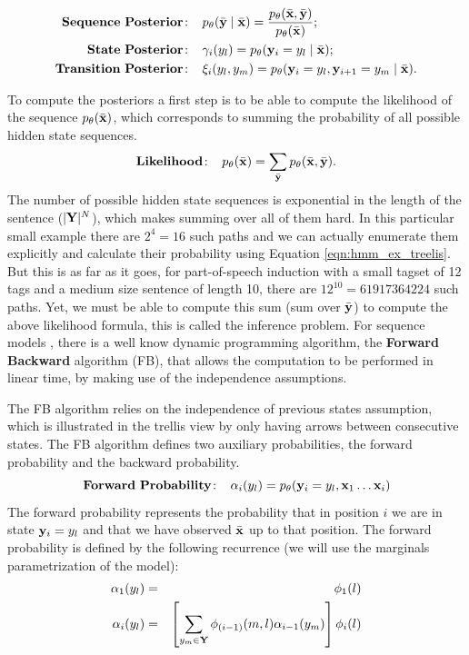 \begin{align}
  \mathbf{Sequence \ Posterior\!:}\;\;\;\; &p_{\theta}(\bar{\mathbf{y}} \mid \bar{\mathbf{x}}) = \frac{p_{\theta}(\bar{\mathbf{x}} ,\bar{\mathbf{y}})}{p_{\theta}(\bar{\mathbf{x}})}; \label{eq::posteriorDistribution} \\
 \mathbf{State \ Posterior\!:}\;\;\;\;  & \gamma_i({y}_l) = p_\theta(\mathbf{y}_i = {y}_l \mid \bar{\mathbf{x}}); \label{eq::nodePosterior} \\
 \mathbf{Transition \ Posterior\!:}\;\;\;\;  &\xi_i({y}_l,{y}_m) = p_\theta(\mathbf{y}_i = {y}_l, \mathbf{y}_{i+1}= {y}_m  \mid \bar{\mathbf{x}}).\label{eq::edgePosterior}
\end{align}

To compute the posteriors a first step is to be able to compute the 
likelihood of
the sequence $p_{\theta}(\bar{\mathbf{x}})$, which corresponds to summing the probability of all
possible hidden state sequences.
\begin{equation}
\label{likelihoood}
\mathbf{Likelihood\!:}\;\;\;\; p_{\theta}(\bar{\mathbf{x}}) = \displaystyle \sum_{\bar{\mathbf{y}}} p_{\theta}(\bar{\mathbf{x}} ,\bar{\mathbf{y}}).
\end{equation}
The number of possible hidden state sequences is exponential in the
length of the sentence ($|\mathbf{Y}|^N$),
 which makes summing over all of them hard. In this particular small
 example there are $2^4 = 16$ such paths and we can actually enumerate
 them explicitly and calculate their probability using Equation \ref{eqn:hmm_ex_treelis}. But this is as far as it goes, for part-of-speech
 induction with a small tagset of 12 tags and a medium size
 sentence of length 10, there are $12^{10} = 61 917 364 224$ such
 paths. 
Yet, we must be able to compute this sum (sum over $\bar{\mathbf{y}}$) to compute the above likelihood
formula, this is called the inference problem. For sequence models , there is a well know dynamic programming algorithm,
the \textbf{Forward Backward} algorithm (FB), that allows the computation
to be performed in linear time, by making use of the independence assumptions.

The FB algorithm relies on the independence of previous states
assumption, which  
is illustrated in the trellis view by only having arrows between consecutive states. 
The FB algorithm defines two auxiliary probabilities, the forward probability and the backward probability. 
\begin{equation}
\label{eq::forward}
\mathbf{Forward \ Probability\!:}\;\;\;\;  \alpha_i({y}_l) = p_{\theta}(\mathbf{y}_i = {y}_l , \mathbf{x}_1 \ldots \mathbf{x}_i)
\end{equation}
The forward probability represents the probability that in position
$i$ we are in state $\mathbf{y}_i = {y}_l$ and that we have observed $\bar{\mathbf{x}}$
up to that position. The forward probability is defined by the
following recurrence (we will use the marginals parametrization of the
model): 
\begin{eqnarray}
\alpha_1({y}_l) &=& \phi_1(l) \\
\alpha_i({y}_l) &=& \left[ \displaystyle \sum_{{y}_m \in \mathbf{Y}} \phi_{(i-1)}(m,l) \alpha_{i-1}({y}_m) \right] \phi_i(l) \label{forwardRecursion}
\end{eqnarray}

